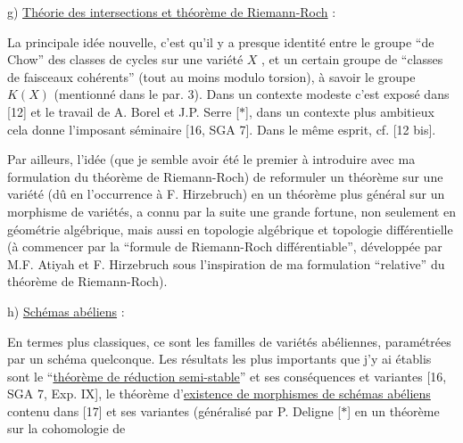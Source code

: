 
g) \uline{Théorie des intersections et théorème de Riemann-Roch} :

La principale idée nouvelle, c'est qu'il y
a presque identité entre le groupe ``de Chow'' des
classes de cycles sur une variété $X$ , et un certain
groupe de ``classes de faisceaux cohérents'' (tout au
moins modulo torsion), à savoir le groupe $K(X)$
(mentionné dans le par. 3). Dans un contexte modeste
c'est exposé dans [12] et le travail de A. Borel et
J.P. Serre [$*$], dans un contexte plus ambitieux cela
donne l'imposant séminaire [16, SGA 7]. Dans le même
esprit, cf. [12 bis].

Par ailleurs, l'idée (que je semble avoir été
le premier à introduire avec ma formulation du théorème
de Riemann-Roch) de reformuler un théorème sur une
variété (dû en l'occurrence à F. Hirzebruch) en un
théorème plus général sur un morphisme de variétés, a
connu par la suite une grande fortune, non seulement
en géométrie algébrique, mais aussi en topologie
algébrique et topologie différentielle (à commencer par
la ``formule de Riemann-Roch différentiable'', développée
par M.F. Atiyah et F. Hirzebruch sous l'inspiration de
ma formulation ``relative'' du théorème de Riemann-Roch).

h) \uline{Schémas abéliens} :

En termes plus classiques, ce sont les familles
de variétés abéliennes, paramétrées par un schéma
quelconque. Les résultats les plus importants que j'y
ai établis sont le ``\uline{théorème de réduction semi-stable}''
et ses conséquences et variantes [16, SGA 7, Exp. IX],
le théorème d'\uline{existence de morphismes de schémas abéliens}
contenu dans [17] et ses variantes (généralisé par
P. Deligne [$*$] en un théorème sur la cohomologie de

